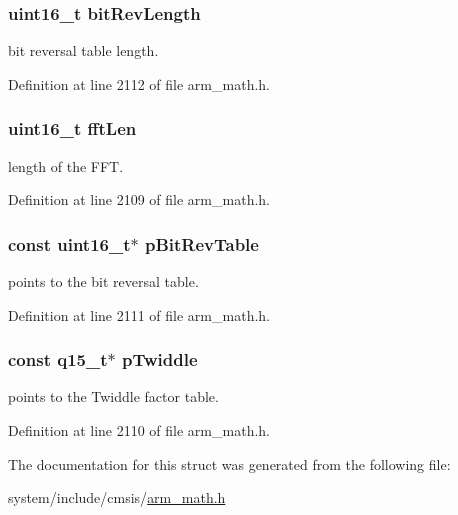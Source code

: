 \subsubsection[{\texorpdfstring{bit\+Rev\+Length}{bitRevLength}}]{\setlength{\rightskip}{0pt plus 5cm}uint16\+\_\+t bit\+Rev\+Length}\hypertarget{structarm__cfft__instance__q15_a65e1b3e327b8fab9404287ed8f347cc8}{}\label{structarm__cfft__instance__q15_a65e1b3e327b8fab9404287ed8f347cc8}
bit reversal table length. 

Definition at line 2112 of file arm\+\_\+math.\+h.

\subsubsection[{\texorpdfstring{fft\+Len}{fftLen}}]{\setlength{\rightskip}{0pt plus 5cm}uint16\+\_\+t fft\+Len}\hypertarget{structarm__cfft__instance__q15_ab8db3bbe7c61e6bb8ca2a55e3446e11a}{}\label{structarm__cfft__instance__q15_ab8db3bbe7c61e6bb8ca2a55e3446e11a}
length of the F\+FT. 

Definition at line 2109 of file arm\+\_\+math.\+h.

\subsubsection[{\texorpdfstring{p\+Bit\+Rev\+Table}{pBitRevTable}}]{\setlength{\rightskip}{0pt plus 5cm}const uint16\+\_\+t$\ast$ p\+Bit\+Rev\+Table}\hypertarget{structarm__cfft__instance__q15_a3b229432d381b0a511a9cdbe3aa74e78}{}\label{structarm__cfft__instance__q15_a3b229432d381b0a511a9cdbe3aa74e78}
points to the bit reversal table. 

Definition at line 2111 of file arm\+\_\+math.\+h.

\subsubsection[{\texorpdfstring{p\+Twiddle}{pTwiddle}}]{\setlength{\rightskip}{0pt plus 5cm}const {\bf q15\+\_\+t}$\ast$ p\+Twiddle}\hypertarget{structarm__cfft__instance__q15_a7f19217cfa0370f9e518caa882265386}{}\label{structarm__cfft__instance__q15_a7f19217cfa0370f9e518caa882265386}
points to the Twiddle factor table. 

Definition at line 2110 of file arm\+\_\+math.\+h.



The documentation for this struct was generated from the following file\+:\begin{DoxyCompactItemize}
\item 
system/include/cmsis/\hyperlink{arm__math_8h}{arm\+\_\+math.\+h}\end{DoxyCompactItemize}
